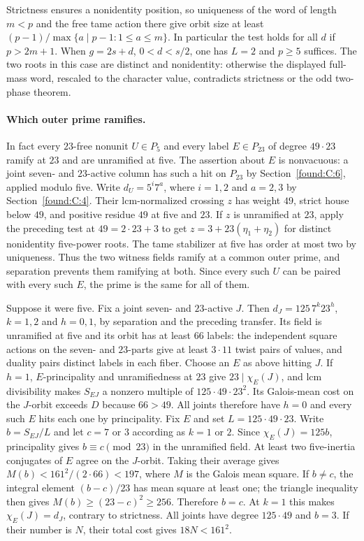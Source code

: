 \documentclass[11pt,a4paper]{article}
\numberwithin{equation}{section}
\theoremstyle{remark}
\begin{document}
Strictness ensures a nonidentity position, so uniqueness of the
word of length $m<p$ and the free tame action there give orbit size
at least $(p-1)/\max\{a\mid p-1:1\le a\le m\}$. In particular the
test holds for all $d$ if $p>2m+1$. When $g=2s+d$, $0<d<s/2$,
one has $L=2$ and $p\ge5$ suffices. The two roots in this case
are distinct and nonidentity: otherwise the displayed full-mass
word, rescaled to the character value, contradicts strictness or
the odd two-phase theorem.

\paragraph{Which outer prime ramifies.}
In fact every $23$-free nonunit $U\in P_5$ and every label
$E\in P_{23}$ of degree $49\cdot23$ ramify at $23$ and are
unramified at five. The assertion about $E$ is nonvacuous:
a joint seven- and $23$-active column has such a hit on $P_{23}$
by Section~\ref{found:C:6}, applied modulo five.
Write $d_U=5^i7^a$, where $i=1,2$ and $a=2,3$ by Section~\ref{found:C:4}. Their lcm-normalized crossing $z$ has weight $49$,
strict house below $49$, and positive residue $49$ at five and $23$. If $z$ is unramified at $23$, apply the preceding test at
$49=2\cdot23+3$ to get $z=3+23(\eta_1+\eta_2)$ for distinct
nonidentity five-power roots. The
tame stabilizer at five has order at most two by uniqueness. Thus
the two witness fields ramify at a common outer prime, and separation
prevents them ramifying at both. Since every such $U$ can be paired
with every such $E$, the prime is the same for all of them.

Suppose it were five. Fix a joint seven- and $23$-active $J$.
Then $d_J=125\,7^k23^h$, $k=1,2$ and $h=0,1$, by separation
and the preceding transfer. Its field is unramified at five and its
orbit has at least $66$ labels: the independent square actions
on the seven- and $23$-parts give at least $3\cdot11$ twist pairs
of values, and duality pairs distinct labels in each fiber.
Choose an $E$ as above hitting $J$. If $h=1$, $E$-principality and
unramifiedness at $23$ give $23\mid\chi_E(J)$, and lcm divisibility
makes $S_{EJ}$ a nonzero multiple of $125\cdot49\cdot23^2$.
Its Galois-mean cost on the $J$-orbit exceeds $D$ because $66>49$.
All joints therefore have $h=0$ and every such $E$ hits each one by
principality. Fix $E$ and set $L=125\cdot49\cdot23$.
Write $b=S_{EJ}/L$ and let $c=7$ or $3$ according as $k=1$ or $2$.
Since $\chi_E(J)=125b$, principality gives $b\equiv c\pmod{23}$
in the unramified field. At least two five-inertia conjugates of
$E$ agree on the $J$-orbit. Taking their average gives
$M(b)<161^2/(2\cdot66)<197$, where $M$ is the Galois mean square.
If $b\ne c$, the integral element $(b-c)/23$ has mean square at
least one; the triangle inequality then gives $M(b)\ge(23-c)^2
\ge256$. Therefore $b=c$. At $k=1$ this makes $\chi_E(J)=d_J$,
contrary to strictness. All joints have degree $125\cdot49$ and
$b=3$. If their number is $N$, their total cost gives $18N<161^2$.
\end{document}
